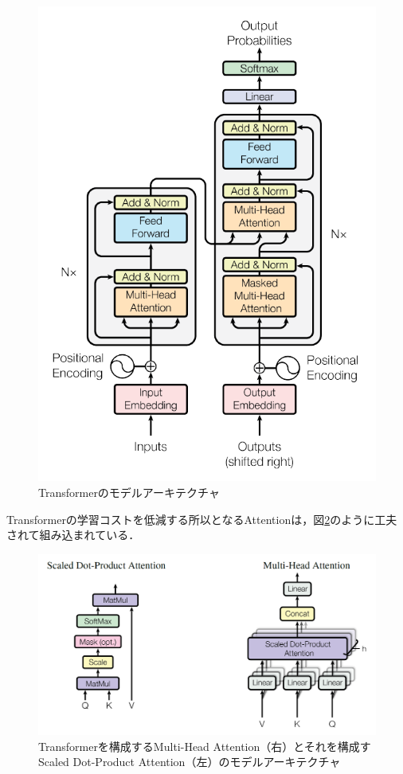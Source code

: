 \documentclass[12pt,a4j]{jreport}
\begin{document}
\begin{figure}[H]
	\centering
	\includegraphics[keepaspectratio, width=120mm]{img/transformer.png}
	\caption{Transformerのモデルアーキテクチャ\protect\footnotemark[2]}
	\label{fig_transformer}
\end{figure}

Transformerの学習コストを低減する所以となるAttentionは，図\ref{fig_attentions-of-transformer}のように工夫されて組み込まれている．

\begin{figure}[H]
	\centering
	\includegraphics[keepaspectratio, width=120mm]{img/attentions-of-transformer.png}
	\caption{Transformerを構成するMulti-Head Attention（右）とそれを構成すScaled Dot-Product Attention（左）のモデルアーキテクチャ\protect\footnotemark[3]}
	\label{fig_attentions-of-transformer}
\end{figure}
\end{document}
